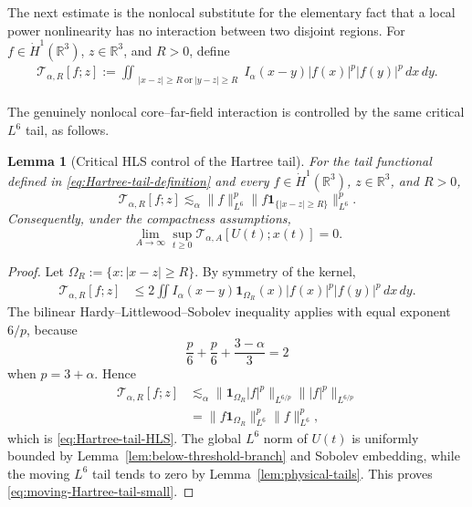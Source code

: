 \documentclass[preprint,12pt]{elsarticle}
\numberwithin{equation}{section}
\newtheorem{lemma}[theorem]{Lemma}
\theoremstyle{remark}
\newcommand{\R}{\mathbb R}
\newcommand{\dd}{\,d}
\newcommand{\Ttail}[1]{\mathcal T_{\alpha,#1}}
\newcommand{\one}{\mathbf 1}
\begin{document}
The next estimate is the nonlocal substitute for the elementary fact that a local power nonlinearity has no interaction between two disjoint regions. For $f\in\dot H^1(\R^3)$, $z\in\R^3$, and $R>0$, define
\begin{align}\label{eq:Hartree-tail-definition}
  \Ttail{R}[f;z]
  :=\iint_{\substack{|x-z|\ge R\ \text{or}\ |y-z|\ge R}}
  I_\alpha(x-y)|f(x)|^p|f(y)|^p\dd x\dd y.
\end{align}

The genuinely nonlocal core--far-field interaction is controlled by the same critical $L^6$ tail, as follows.

\begin{lemma}[Critical HLS control of the Hartree tail]\label{lem:Hartree-tail-HLS}
For the tail functional defined in \eqref{eq:Hartree-tail-definition} and every $f\in\dot H^1(\R^3)$, $z\in\R^3$, and $R>0$,
\begin{equation}\label{eq:Hartree-tail-HLS}
  \Ttail{R}[f;z]
  \lesssim_\alpha
  \|f\|_{L^6}^{p}
  \|f\one_{\{|x-z|\ge R\}}\|_{L^6}^{p}.
\end{equation}
Consequently, under the compactness assumptions,
\begin{equation}\label{eq:moving-Hartree-tail-small}
  \lim_{A\to\infty}
  \sup_{t\ge0}\Ttail{A}[U(t);x(t)]=0.
\end{equation}
\end{lemma}

\begin{proof}
Let $\Omega_R:=\{x:|x-z|\ge R\}$. By symmetry of the kernel,
\begin{align*}
  \Ttail{R}[f;z]
  &\le2\iint I_\alpha(x-y)
  \one_{\Omega_R}(x)|f(x)|^p|f(y)|^p\dd x\dd y.
\end{align*}
The bilinear Hardy--Littlewood--Sobolev inequality applies with equal exponent $6/p$, because
\begin{equation*}
  \frac p6+\frac p6+\frac{3-\alpha}{3}=2
\end{equation*}
when $p=3+\alpha$. Hence
\begin{align*}
  \Ttail{R}[f;z]
  &\lesssim_\alpha
  \|\one_{\Omega_R}|f|^p\|_{L^{6/p}}
  \||f|^p\|_{L^{6/p}}\\
  &=\|f\one_{\Omega_R}\|_{L^6}^p\|f\|_{L^6}^p,
\end{align*}
which is \eqref{eq:Hartree-tail-HLS}. The global $L^6$ norm of $U(t)$ is uniformly bounded by Lemma~\ref{lem:below-threshold-branch} and Sobolev embedding, while the moving $L^6$ tail tends to zero by Lemma~\ref{lem:physical-tails}. This proves \eqref{eq:moving-Hartree-tail-small}.
\end{proof}
\end{document}
